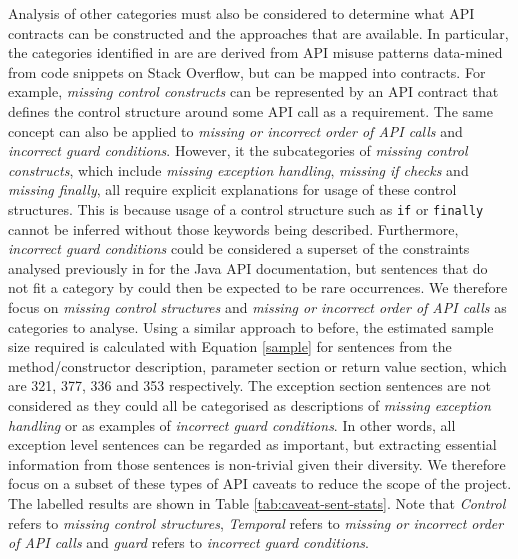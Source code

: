 Analysis of other categories must also be considered to determine what API contracts can be constructed and the approaches that are available. In particular, the categories identified in \cite{code-examples} are are derived from API misuse patterns data-mined from code snippets on Stack Overflow, but can be mapped into contracts. For example, \textit{missing control constructs} can be represented by an API contract that defines the control structure around some API call as a requirement. The same concept can also be applied to \textit{missing or incorrect order of API calls} and \textit{incorrect guard conditions}. However, it the subcategories of \textit{missing control constructs}, which include \textit{missing exception handling}, \textit{missing if checks} and \textit{missing finally}, all require explicit explanations for usage of these control structures. This is because usage of a control structure such as \lstinline{if} or \lstinline{finally} cannot be inferred without those keywords being described. Furthermore, \textit{incorrect guard conditions} could be considered a superset of the constraints analysed previously in \cite{zhou-directive} for the Java API documentation, but sentences that do not fit a category by \cite{zhou-directive} could then be expected to be rare occurrences. We therefore focus on \textit{missing control structures} and \textit{missing or incorrect order of API calls} as categories to analyse. Using a similar approach to before, the estimated sample size required is calculated with Equation \ref{sample} for sentences from the method/constructor description, parameter section or return value section, which are 321, 377, 336 and 353 respectively. The exception section sentences are not considered as they could all be categorised as descriptions of \textit{missing exception handling} or as examples of \textit{incorrect guard conditions}. In other words, all exception level sentences can be regarded as important, but extracting essential information from those sentences is non-trivial given their diversity. We therefore focus on a subset of these types of API caveats to reduce the scope of the project. The labelled results are shown in Table \ref{tab:caveat-sent-stats}. Note that \textit{Control} refers to \textit{missing control structures}, \textit{Temporal} refers to \textit{missing or incorrect order of API calls} and \textit{guard} refers to \textit{incorrect guard conditions}.\\

